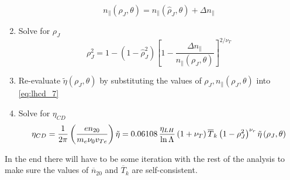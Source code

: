 \begin{enumerate}
\begin{equation}
		n _ { \| } \left( \rho _ { J } , \theta \right) = n _ { \| } \left( \hat { \rho } _ { J } , \theta \right) + \Delta n _ { \| }
	\end{equation}
	\item Solve for $\rho_J$
	\begin{equation}
		\rho _ { J } ^ { 2 } = 1 - \left( 1 - \hat { \rho } _ { J } ^ { 2 } \right) \left[ 1 - \frac { \Delta n _ { \| } } { n _ { \| } \left( \rho _ { J } , \theta \right) } \right] ^ { 2 / \nu _ { T } }
	\end{equation}
	\item Re-evaluate $\tilde { \eta } \left( \rho _ { J } , \theta \right)$ by substituting the values of $\rho _ { J } , n _ { \| } \left( \rho _ { J } , \theta \right)$ into \cref{eq:lhcd_7}
	\item Solve for $\eta_{CD}$
	\begin{equation}
		\small
		\eta _ { C D } = \frac { 1 } { 2 \pi } \left( \frac { e n _ { 20 } } { m _ { e } \nu _ { 0 } v _ { T e } } \right) \tilde { \eta } = 0.06108 \, \frac { \eta _ { L H } } { \ln \Lambda } \left( 1 + \nu _ { T } \right) \overline { T } _ { k } \left( 1 - \rho _ { J } ^ { 2 } \right) ^ { \nu _ { r } } \tilde { \eta } \left( \rho _ { J } , \theta \right)
	\end{equation}
\end{enumerate}
In the end there will have to be some iteration with the rest of the analysis to make sure the values of $\overline n_{20}$ and $\overline T_k$ are self-consistent.

